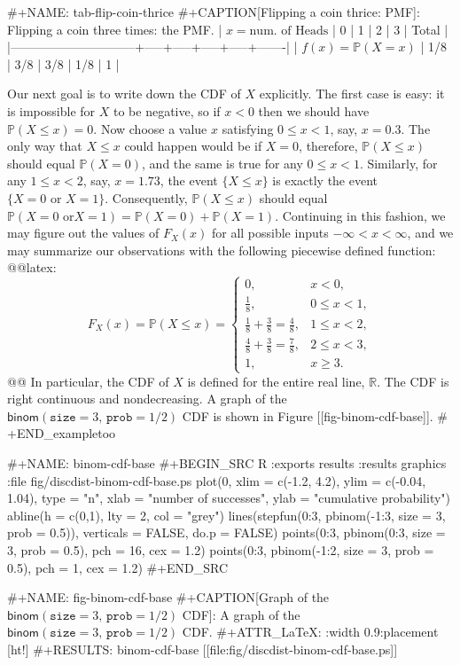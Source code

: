 #+NAME: tab-flip-coin-thrice
#+CAPTION[Flipping a coin thrice: PMF]: Flipping a coin three times: the PMF.
| \(x=\mbox{num. of Heads}\)   |   0 |   1 |   2 |   3 | Total |
|------------------------------+-----+-----+-----+-----+-------|
| \(f(x) = \mathbb{P}(X = x)\) | 1/8 | 3/8 | 3/8 | 1/8 |     1 |

Our next goal is to write down the CDF of \(X\) explicitly. The first
case is easy: it is impossible for \(X\) to be negative, so if \(x<0\)
then we should have \(\mathbb{P}(X\leq x)=0\). Now choose a value
\(x\) satisfying \(0\leq x<1\), say, \(x=0.3\). The only way that
\(X\leq x\) could happen would be if \(X=0\), therefore,
\(\mathbb{P}(X\leq x)\) should equal \(\mathbb{P}(X=0)\), and the same
is true for any \(0\leq x<1\). Similarly, for any \(1\leq x<2\), say,
\(x=1.73\), the event \(\{ X\leq x \}\) is exactly the event \(\{
X=0\mbox{ or }X=1 \}\). Consequently, \(\mathbb{P}(X\leq x)\) should
equal \(\mathbb{P}(X=0\mbox{ or
}X=1)=\mathbb{P}(X=0)+\mathbb{P}(X=1)\). Continuing in this fashion,
we may figure out the values of \(F_{X}(x)\) for all possible inputs
\(-\infty<x<\infty\), and we may summarize our observations with the
following piecewise defined function: @@latex:\[ F_{X}(x)=\mathbb{P}(X\leq x) = \begin{cases} 0, & x < 0,\\ \frac{1}{8}, & 0\leq x < 1,\\ \frac{1}{8} + \frac{3}{8} = \frac{4}{8}, & 1\leq x < 2,\\ \frac{4}{8} + \frac{3}{8} = \frac{7}{8}, & 2\leq x < 3,\\ 1, & x \geq 3. \end{cases} \]@@
In particular, the CDF of \(X\) is defined for the entire real line,
\(\mathbb{R}\). The CDF is right continuous and nondecreasing. A graph
of the \(\mathsf{binom}(\mathtt{size}=3,\,\mathtt{prob}=1/2)\) CDF is
shown in Figure [[fig-binom-cdf-base]].
# +END_exampletoo

#+NAME: binom-cdf-base
#+BEGIN_SRC R :exports results :results graphics :file fig/discdist-binom-cdf-base.ps
plot(0, xlim = c(-1.2, 4.2), ylim = c(-0.04, 1.04), type = "n", xlab = "number of successes", ylab = "cumulative probability")
abline(h = c(0,1), lty = 2, col = "grey")
lines(stepfun(0:3, pbinom(-1:3, size = 3, prob = 0.5)), verticals = FALSE, do.p = FALSE)
points(0:3, pbinom(0:3, size = 3, prob = 0.5), pch = 16, cex = 1.2)
points(0:3, pbinom(-1:2, size = 3, prob = 0.5), pch = 1, cex = 1.2)
#+END_SRC

#+NAME: fig-binom-cdf-base
#+CAPTION[Graph of the \(\mathsf{binom}(\mathtt{size}=3,\,\mathtt{prob}=1/2)\) CDF]: \small A graph of the \(\mathsf{binom}(\mathtt{size}=3,\,\mathtt{prob}=1/2)\) CDF. 
#+ATTR_LaTeX: :width 0.9\textwidth :placement [ht!]
#+RESULTS: binom-cdf-base
[[file:fig/discdist-binom-cdf-base.ps]]

